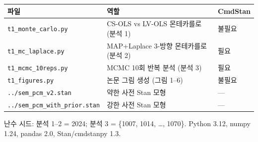 \documentclass[a4paper,10pt]{oblivoir}
\begin{document}
\begin{table}[htbp]
\centering
\small
\begin{tabular}{lll}
\toprule
파일 & 역할 & CmdStan \\
\midrule
\texttt{t1\_monte\_carlo.py} & CS-OLS vs LV-OLS 몬테카를로 (분석 1) & 불필요 \\
\texttt{t1\_mc\_laplace.py} & MAP+Laplace 3-방향 몬테카를로 (분석 2) & 필요 \\
\texttt{t1\_mcmc\_10reps.py} & MCMC 10회 반복 분석 (분석 3) & 필요 \\
\texttt{t1\_figures.py} & 논문 그림 생성 (그림 1--6) & 불필요 \\
\texttt{../sem\_pcm\_v2.stan} & 약한 사전 Stan 모형 & --- \\
\texttt{../sem\_pcm\_with\_prior.stan} & 강한 사전 Stan 모형 & --- \\
\bottomrule
\end{tabular}
\end{table}

난수 시드: 분석 1--2 = 2024; 분석 3 = \{1007, 1014, \ldots, 1070\}. Python 3.12, numpy 1.24, pandas 2.0, Stan/cmdstanpy 1.3.
\end{document}

